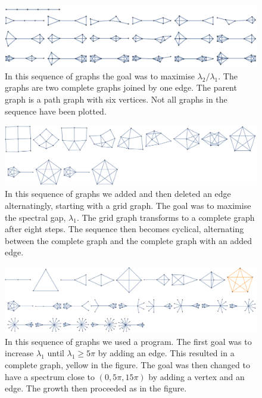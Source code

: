 \documentclass[a4paper]{article}
\begin{document}
\begin{figure}[h]
\centering
\includegraphics[width=1.0\textwidth]{MaxRatio.pdf}
\caption{\label{MaxRatio:all}In this sequence of graphs the goal was to maximise $\lambda_{2}/\lambda_{1}$. The graphs are two complete graphs joined by one edge. The parent graph is a path graph with six vertices. Not all graphs in the sequence have been plotted.}
\end{figure}

\begin{figure}
\centering
\includegraphics[width=1.0\textwidth]{GridToComplete.pdf}
\caption{\label{GridToComplete:all}In this sequence of graphs we added and then deleted an edge alternatingly, starting with a grid graph. The goal was to maximise the spectral gap, $\lambda_{1}$. The grid graph transforms to a complete graph after eight steps. The sequence then becomes cyclical, alternating between the complete graph and the complete graph with an added edge.}
\end{figure}

\begin{figure}
\centering
\includegraphics[width=1.0\textwidth]{Program.pdf}
\caption{\label{Program:all}In this sequence of graphs we used a program. The first goal was to increase $\lambda_{1}$ until $\lambda_{1}\geq 5\pi$ by adding an edge. This resulted in a complete graph, yellow in the figure. The goal was then changed to have a spectrum close to $(0, 5\pi,15\pi)$ by adding a vertex and an edge. The growth then proceeded as in the figure.}
\end{figure}
\end{document}
